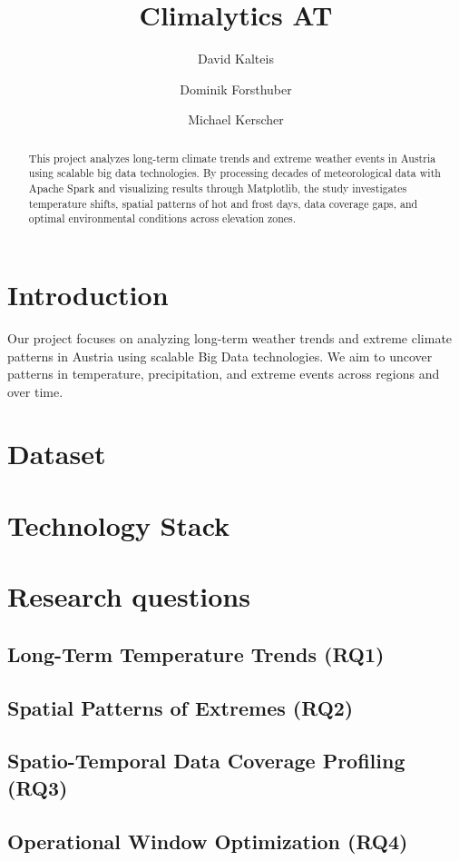 \documentclass[sigconf]{acmart}
\title{Climalytics AT}
\author{David Kalteis}
\affiliation{\institution{FH Hagenberg}\department{Mobile Computing}\country{Austria}}
\author{Dominik Forsthuber}
\affiliation{\institution{FH Hagenberg}\department{Mobile Computing}\country{Austria}}
\author{Michael Kerscher}
\affiliation{\institution{FH Hagenberg}\department{Mobile Computing}\country{Austria}}
\begin{document}
\begin{abstract}
This project analyzes long-term climate trends and extreme weather events in Austria using scalable big data technologies. By processing decades of meteorological data with Apache Spark and visualizing results through Matplotlib, the study investigates temperature shifts, spatial patterns of hot and frost days, data coverage gaps, and optimal environmental conditions across elevation zones.
\end{abstract}

\maketitle

\section{Introduction}
Our project focuses on analyzing long-term weather trends and extreme climate patterns in Austria using scalable Big Data technologies. We aim to uncover patterns in temperature, precipitation, and extreme events across regions and over time.

\section{Dataset}


\section{Technology Stack}


\section{Research questions}
\subsection{Long-Term Temperature Trends (RQ1)}


\subsection{Spatial Patterns of Extremes (RQ2)}


\subsection{Spatio-Temporal Data Coverage Profiling (RQ3)}


\subsection{Operational Window Optimization (RQ4)}




\end{document}
